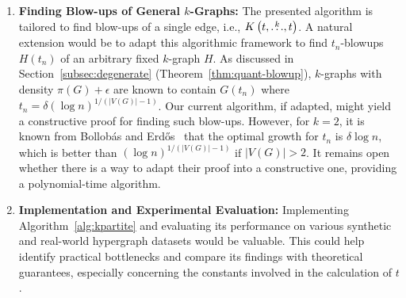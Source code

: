 \begin{enumerate}
    \item \textbf{Finding Blow-ups of General $k$-Graphs:}
    The presented algorithm is tailored to find blow-ups of a single edge, i.e., $K\left(t, \overset{k}{\dots}, t\right)$.
    A natural extension would be to adapt this algorithmic framework to find $t_n$-blowups $H(t_n)$ of an arbitrary fixed $k$-graph $H$.
    As discussed in Section~\ref{subsec:degenerate} (Theorem~\ref{thm:quant-blowup}), $k$-graphs with density $\pi(G) + \epsilon$
    are known to contain $G(t_n)$ where $t_n = \delta (\log n)^{1/(|V(G)|-1)}$.
    Our current algorithm, if adapted, might yield a constructive proof for finding such blow-ups.
    However, for $k=2$, it is known from Bollobás and Erd\H{o}s~\cite{bollobas1973structure} that the optimal growth for $t_n$
    is $\delta \log n$, which is better than $(\log n)^{1/(|V(G)|-1)}$ if $|V(G)| > 2$.
    It remains open whether there is a way to adapt their proof into a constructive one,
    providing a polynomial-time algorithm.


    \item \textbf{Implementation and Experimental Evaluation:}
    Implementing Algorithm~\ref{alg:kpartite}
    and evaluating its performance on various synthetic and real-world hypergraph datasets would be valuable.
    This could help identify practical bottlenecks and compare its findings with theoretical guarantees,
    especially concerning the constants involved in the calculation of $t$.
\end{enumerate}
